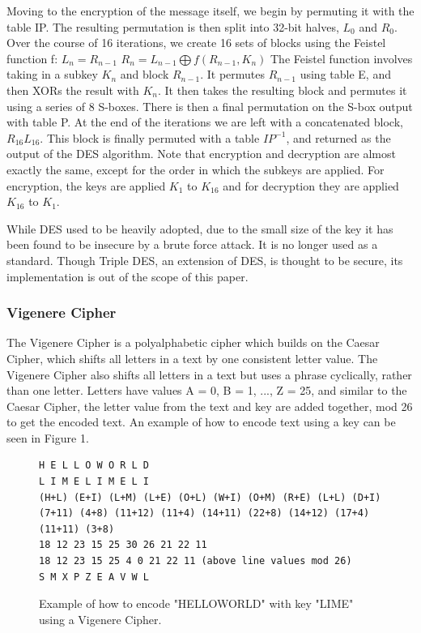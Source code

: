 \documentclass[acmlarge]{acmart}
\begin{document}
Moving to the encryption of the message itself, we begin by permuting it with the table IP. The resulting permutation is then split into 32-bit halves, $L_{0}$ and $R_{0}$. Over the course of 16 iterations, we create 16  sets of blocks using the Feistel function f:
$L_{n} = R_{n-1}$
$R_{n} = L_{n-1} \bigoplus f(R_{n-1}, K_{n})$ 
	The Feistel function involves taking in a subkey $K_{n}$ and block $R_{n - 1}$. It permutes $R_{n - 1}$ using table E, and then XORs the result with $K_{n}$. It then takes the resulting block and permutes it using a series of 8 S-boxes. There is then a final permutation on the S-box output with table P. At the end of the iterations we are left with a concatenated block, $R_{16}L_{16}$. This block is finally permuted with a table $IP^{-1}$, and returned as the output of the DES algorithm. Note that encryption and decryption are almost exactly the same, except for the order in which the subkeys are applied. For encryption, the keys are applied $K_{1}$ to $K_{16}$ and for decryption they are applied $K_{16}$ to $K_{1}$.

While DES used to be heavily adopted, due to the small size of the key it has been found to be insecure by a brute force attack. It is no longer used as a standard. Though Triple DES, an extension of DES, is thought to be secure, its implementation is out of the scope of this paper. 

\subsubsection{Vigenere Cipher}
The Vigenere Cipher is a polyalphabetic cipher which builds on the Caesar Cipher, which shifts all letters in a text by one consistent letter value. The Vigenere Cipher also shifts all letters in a text but uses a phrase cyclically, rather than one letter. Letters have values A = 0, B = 1, ..., Z = 25, and similar to the Caesar Cipher, the letter value from the text and key are added together, mod 26 to get the encoded text. An example of how to encode text using a key can be seen in Figure 1.

\begin{figure}
\centering
\begin{BVerbatim}
H E L L O W O R L D
L I M E L I M E L I
(H+L) (E+I) (L+M) (L+E) (O+L) (W+I) (O+M) (R+E) (L+L) (D+I)
(7+11) (4+8) (11+12) (11+4) (14+11) (22+8) (14+12) (17+4) (11+11) (3+8)
18 12 23 15 25 30 26 21 22 11
18 12 23 15 25 4 0 21 22 11 (above line values mod 26)
S M X P Z E A V W L
\end{BVerbatim}
\caption{Example of how to encode "HELLOWORLD" with key "LIME" using a Vigenere Cipher.}
\label{fig:despython}
\end{figure}
\end{document}
